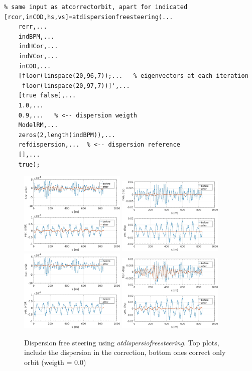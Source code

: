 \begin{lstlisting}
% same input as atcorrectorbit, apart for indicated
[rcor,inCOD,hs,vs]=atdispersionfreesteering(...
    rerr,...
    indBPM,...
    indHCor,...
    indVCor,...
    inCOD,...
    [floor(linspace(20,96,7));...   % eigenvectors at each iteration
     floor(linspace(20,97,7))]',...
    [true false],...
    1.0,...
    0.9,...   % <-- dispersion weigth
    ModelRM,...
    zeros(2,length(indBPM)),...
    refdispersion,...  % <-- dispersion reference
    [],...
    true);
		\end{lstlisting}

\begin{figure}[!h]
	\centering
	\includegraphics[width=0.45\textwidth]{./images/corrections/DFS/OrbCor.jpg}
	\includegraphics[width=0.45\textwidth]{./images/corrections/DFS/DispCor.jpg}\\
	\includegraphics[width=0.45\textwidth]{./images/corrections/DFS/OrbCorNoDisp.jpg}
	\includegraphics[width=0.45\textwidth]{./images/corrections/DFS/DispCorNoDisp.jpg}
	\caption{Dispersion free steering using \emph{atdispersiofreesteering}. Top plots, include the dispersion in the correction, bottom ones correct only orbit (weigth = 0.0) }
	\label{fig:DFScor}
\end{figure}

